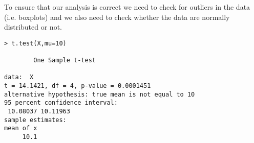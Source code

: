 To ensure that our analysis is correct we need to check for
outliers in the data (i.e. boxplots) and we also need to check
whether the data are normally distributed or not.

\begin{framed}
\begin{verbatim}
> t.test(X,mu=10)

        One Sample t-test

data:  X 
t = 14.1421, df = 4, p-value = 0.0001451
alternative hypothesis: true mean is not equal to 10 
95 percent confidence interval:
 10.08037 10.11963 
sample estimates:
mean of x 
     10.1 
\end{verbatim}
\end{framed}
